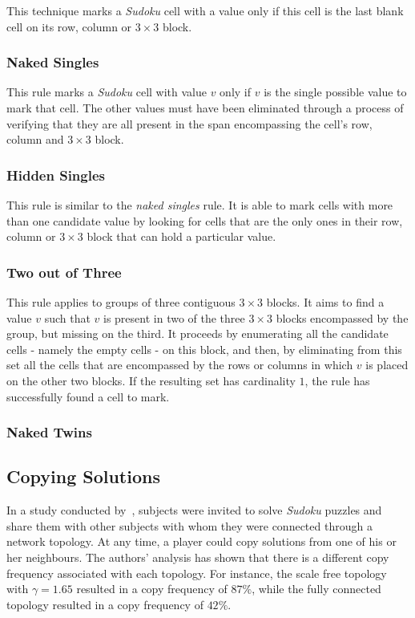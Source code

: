 \documentclass[letterpaper]{article}
\begin{document}
This technique marks a {\em Sudoku} cell with a value only if this cell is the last blank cell on its row, column or $3 \times 3$ block.

\subsubsection{Naked Singles}

This rule marks a {\em Sudoku} cell with value $v$ only if $v$ is the single possible value to mark that cell. The other values must have been eliminated through a process of verifying that they are all present in the span encompassing the cell's row, column and $3 \times 3$ block.

\subsubsection{Hidden Singles}

This rule is similar to the {\em naked singles} rule. It is able to mark cells with more than one candidate value by looking for cells that are the only ones in their row, column or $3 \times 3$ block that can hold a particular value.

\subsubsection{Two out of Three}

This rule applies to groups of three contiguous $3 \times 3$ blocks. It aims to find a value $v$ such that $v$ is present in two of the three $3 \times 3$ blocks encompassed by the group, but missing on the third. It proceeds by enumerating all the candidate cells - namely the empty cells - on this block, and then, by eliminating from this set all the cells that are encompassed by the rows or columns in which $v$ is placed on the other two blocks. If the resulting set has cardinality $1$, the rule has successfully found a cell to mark.

\subsubsection{Naked Twins}

\subsection{Copying Solutions}

In a study conducted by~\cite{farenzena:collabem}, subjects were invited to solve {\em Sudoku} puzzles and share them with other subjects with whom they were connected through a network topology. At any time, a player could copy solutions from one of his or her neighbours. The authors' analysis has shown that there is a different copy frequency associated with each topology. For instance, the scale free topology with $\gamma = 1.65$ resulted in a copy frequency of $87 \%$, while the fully connected topology resulted in a copy frequency of $42 \%$.
\end{document}
